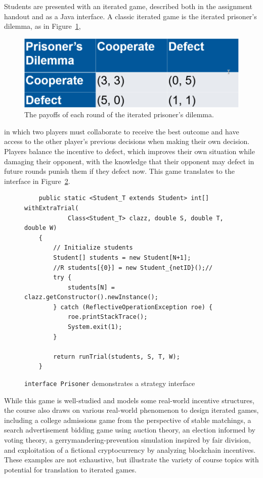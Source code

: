 \documentclass[pageno]{jpaper}
\begin{document}
Students are presented with an iterated game, described both in the assignment handout and as a Java interface.
A classic iterated game is the iterated prisoner's dilemma, as in Figure~\ref{fig:pd},
\begin{figure}[hbt]
  \centering
  \includegraphics[scale=0.5]{pd.png}
  \caption{The payoffs of each round of the iterated prisoner's dilemma.}\label{fig:pd}
\end{figure}
in which two players must collaborate to receive the best outcome and have access to the other player's previous decisions when making their own decision.
Players balance the incentive to defect, which improves their own situation while damaging their opponent, with the knowledge that their opponent may defect in future rounds punish them if they defect now.
This game translates to the interface in Figure~\ref{minted:Prisoner}.
\begin{figure}[hbt]
\begin{verbatim}
    public static <Student_T extends Student> int[] withExtraTrial(
            Class<Student_T> clazz, double S, double T, double W)
    {
        // Initialize students
        Student[] students = new Student[N+1];
        //R students[{0}] = new Student_{netID}();//
        try {
            students[N] = clazz.getConstructor().newInstance();
        } catch (ReflectiveOperationException roe) {
            roe.printStackTrace();
            System.exit(1);
        }

        return runTrial(students, S, T, W);
    }
\end{verbatim}
  \caption{\texttt{interface Prisoner} demonstrates a strategy interface}\label{minted:Prisoner}
\end{figure}
While this game is well-studied and models some real-world incentive structures, the course also draws on various real-world phenomenon to design iterated games, including a college admissions game from the perspective of stable matchings, a search advertisement bidding game using auction theory, an election informed by voting theory, a gerrymandering-prevention simulation inspired by fair division, and exploitation of a fictional cryptocurrency by analyzing blockchain incentives.
These examples are not exhaustive, but illustrate the variety of course topics with potential for translation to iterated games.
\end{document}
